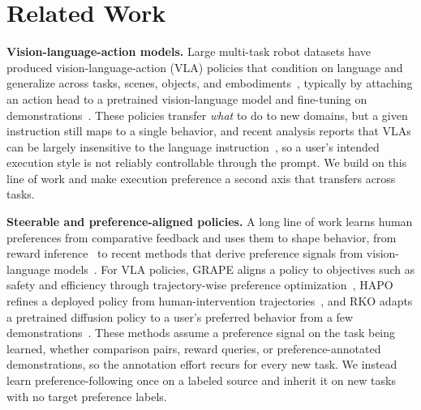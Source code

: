 \documentclass{article}
\begin{document}


\section{Related Work}
\label{sec:related}

\textbf{Vision-language-action models.}
Large multi-task robot datasets have produced vision-language-action (VLA) policies that condition on language and generalize across tasks, scenes, objects, and embodiments~\citep{o2024open, kim2024openvla, black2024pi0}, typically by attaching an action head to a pretrained vision-language model and fine-tuning on demonstrations~\citep{kim2024openvla, kim2025oft}.
These policies transfer \emph{what} to do to new domains, but a given instruction still maps to a single behavior, and recent analysis reports that VLAs can be largely insensitive to the language instruction~\citep{liberoplus}, so a user's intended execution style is not reliably controllable through the prompt.
We build on this line of work and make execution preference a second axis that transfers across tasks.

\textbf{Steerable and preference-aligned policies.}
A long line of work learns human preferences from comparative feedback and uses them to shape behavior, from reward inference~\citep{Frnkranz2010PreferenceLA, Sadigh2017ActivePL, Peng2025UUPL} to recent methods that derive preference signals from vision-language models~\citep{ghosh2025prefvlm, singh2025varp}.
For VLA policies, GRAPE aligns a policy to objectives such as safety and efficiency through trajectory-wise preference optimization~\citep{zhang2024grape}, HAPO refines a deployed policy from human-intervention trajectories~\citep{xia2025hapo}, and RKO adapts a pretrained diffusion policy to a user's preferred behavior from a few demonstrations~\citep{moletta2026rko}.
These methods assume a preference signal on the task being learned, whether comparison pairs, reward queries, or preference-annotated demonstrations, so the annotation effort recurs for every new task.
We instead learn preference-following once on a labeled source and inherit it on new tasks with no target preference labels.
\end{document}
